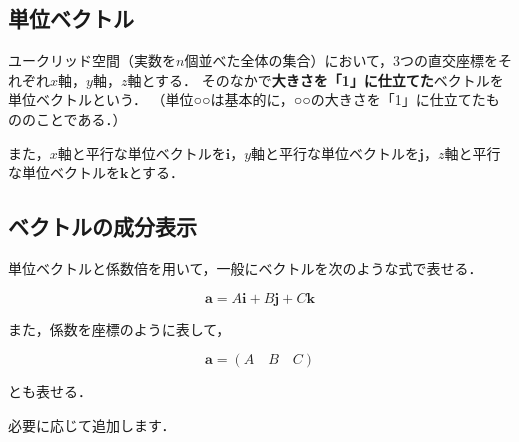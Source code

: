 \documentclass[a4paper,11pt]{ltjsarticle}
\begin{document}
\subsection{単位ベクトル}
\label{sec: vec-unit}

ユークリッド空間（実数を$n$個並べた全体の集合）において，3つの直交座標をそれぞれ$x$軸，$y$軸，$z$軸とする．
そのなかで\textbf{大きさを「1」に仕立てた}ベクトルを単位ベクトルという．
（単位○○は基本的に，○○の大きさを「1」に仕立てたもののことである．）

また，$x$軸と平行な単位ベクトルを$\bm{i}$，$y$軸と平行な単位ベクトルを$\bm{j}$，$z$軸と平行な単位ベクトルを$\bm{k}$とする．

\subsection{ベクトルの成分表示}

単位ベクトルと係数倍を用いて，一般にベクトルを次のような式で表せる．

\begin{equation}
  \bm{a}=A \bm{i}+B \bm{j}+C \bm{k}
\end{equation}

また，係数を座標のように表して，

\begin{equation}
  \bm{a}=(A \quad B \quad C)
\end{equation}

とも表せる．

\clearpage

\pagestyle{fancy}
\lhead{}
\rhead{\textbf{\thepage}}



\nocite{*}

\vspace{5pt}

必要に応じて追加します．

\printindex
\end{document}
